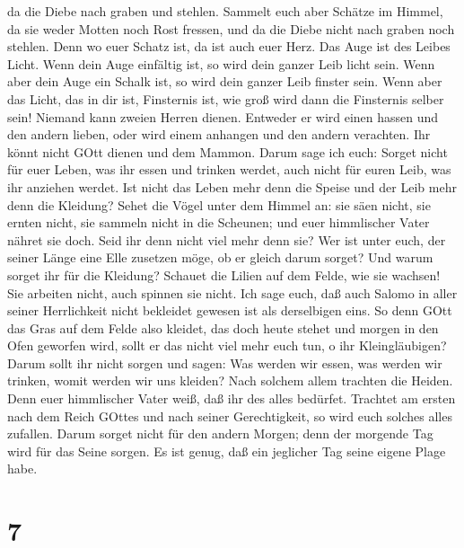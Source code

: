 da die Diebe nach graben und stehlen.  Sammelt euch aber
Schätze im Himmel, da sie weder Motten noch Rost fressen, und da die
Diebe nicht nach graben noch stehlen.  Denn wo euer Schatz
ist, da ist auch euer Herz.  Das Auge ist des Leibes Licht.
Wenn dein Auge einfältig ist, so wird dein ganzer Leib licht sein.
 Wenn aber dein Auge ein Schalk ist, so wird dein ganzer
Leib finster sein. Wenn aber das Licht, das in dir ist, Finsternis ist,
wie groß wird dann die Finsternis selber sein!  Niemand
kann zweien Herren dienen. Entweder er wird einen hassen und den andern
lieben, oder wird einem anhangen und den andern verachten. Ihr könnt
nicht GOtt dienen und dem Mammon.  Darum sage ich euch:
Sorget nicht für euer Leben, was ihr essen und trinken werdet, auch
nicht für euren Leib, was ihr anziehen werdet. Ist nicht das Leben mehr
denn die Speise und der Leib mehr denn die Kleidung?  Sehet
die Vögel unter dem Himmel an: sie säen nicht, sie ernten nicht, sie
sammeln nicht in die Scheunen; und euer himmlischer Vater nähret sie
doch. Seid ihr denn nicht viel mehr denn sie?  Wer ist
unter euch, der seiner Länge eine Elle zusetzen möge, ob er gleich darum
sorget?  Und warum sorget ihr für die Kleidung? Schauet die
Lilien auf dem Felde, wie sie wachsen! Sie arbeiten nicht, auch spinnen
sie nicht.  Ich sage euch, daß auch Salomo in aller seiner
Herrlichkeit nicht bekleidet gewesen ist als derselbigen eins.
 So denn GOtt das Gras auf dem Felde also kleidet, das doch
heute stehet und morgen in den Ofen geworfen wird, sollt er das nicht
viel mehr euch tun, o ihr Kleingläubigen?  Darum sollt ihr
nicht sorgen und sagen: Was werden wir essen, was werden wir trinken,
womit werden wir uns kleiden?  Nach solchem allem trachten
die Heiden. Denn euer himmlischer Vater weiß, daß ihr des alles
bedürfet.  Trachtet am ersten nach dem Reich GOttes und
nach seiner Gerechtigkeit, so wird euch solches alles zufallen.
 Darum sorget nicht für den andern Morgen; denn der
morgende Tag wird für das Seine sorgen. Es ist genug, daß ein jeglicher
Tag seine eigene Plage habe.

\hypertarget{section-6}{%
\section{7}\label{section-6}}

